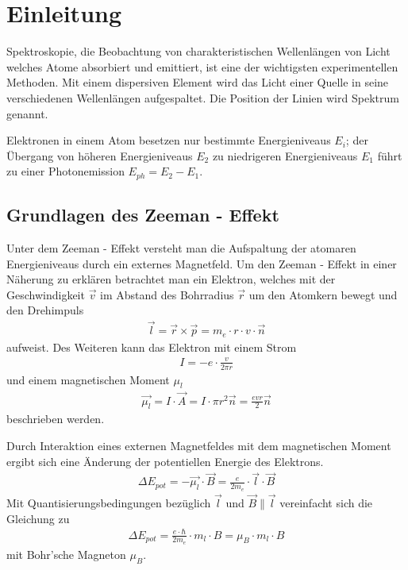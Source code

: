 \documentclass[11pt,a4paper]{article}
\begin{document}
\section{Einleitung}

Spektroskopie, die Beobachtung von charakteristischen Wellenlängen von Licht welches Atome absorbiert und emittiert, ist eine der wichtigsten experimentellen Methoden. Mit einem dispersiven Element wird das Licht einer Quelle in seine verschiedenen Wellenlängen aufgespaltet. Die Position der Linien wird Spektrum genannt.

Elektronen in einem Atom besetzen nur bestimmte Energieniveaus $E_i$; der Übergang von höheren Energieniveaus $E_2$ zu niedrigeren Energieniveaus $E_1$ führt zu einer Photonemission $E_{ph} = E_2 - E_1$.

\subsection{Grundlagen des Zeeman - Effekt}
Unter dem Zeeman - Effekt versteht man die Aufspaltung der atomaren Energieniveaus durch ein externes Magnetfeld. Um den Zeeman - Effekt in einer Näherung zu erklären betrachtet man ein Elektron, welches mit der Geschwindigkeit $\vec{v}$ im Abstand des Bohrradius $\vec{r}$ um den Atomkern bewegt und den Drehimpuls
\begin{align}
	\vec{l} = \vec{r} \times \vec{p} = m_e \cdot r \cdot v \cdot \vec{n}
\end{align}
aufweist. Des Weiteren kann das Elektron mit einem Strom
\begin{align}
	I = -e \cdot \frac{v}{2 \pi r}
\end{align}
und einem magnetischen Moment $\mu_l$
\begin{align}
	\vec{\mu_l} = I \cdot \vec{A} = I \cdot \pi r^2 \vec{n} = \frac{evr}{2}\vec{n}
\end{align}
beschrieben werden.

Durch Interaktion eines externen Magnetfeldes mit dem magnetischen Moment ergibt sich eine Änderung der potentiellen Energie des Elektrons.
\begin{align}
	\Delta E_{pot} = - \vec{\mu_l} \cdot \vec{B} = \frac{e}{2m_e} \cdot \vec{l} \cdot \vec{B}
\end{align}
Mit Quantisierungsbedingungen bezüglich $\vec{l}$ und $\vec{B} \parallel \vec{l}$ vereinfacht sich die Gleichung zu
\begin{align}
	\Delta E_{pot} = \frac{e \cdot \hbar}{2m_e} \cdot m_l \cdot B = \mu_B \cdot m_l \cdot B
\end{align}
mit Bohr'sche Magneton $\mu_B$.
\end{document}

